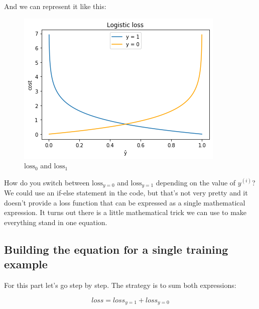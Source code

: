 And we can represent it like this:
\begin{figure}[!h]
    \centering
    \includegraphics[scale=0.55]{assets/log_loss.png}
    \caption{$\text{loss}_0$ and $\text{loss}_1$}
\end{figure}

How do you switch between $\text{loss}_{y=0}$ and $\text{loss}_{y=1}$ depending on the value of $y^{(i)}$? We could use an if-else statement in the code, but that's not very pretty and it doesn't provide a loss function that can be expressed as a single mathematical expression.
It turns out there is a little mathematical trick we can use to make everything stand in one equation.

\newpage
\subsection*{Building the equation for a single training example}
For this part let's go step by step.
The strategy is to sum both expressions:

$$
loss = loss_{y=1} + loss_{y=0}
$$

